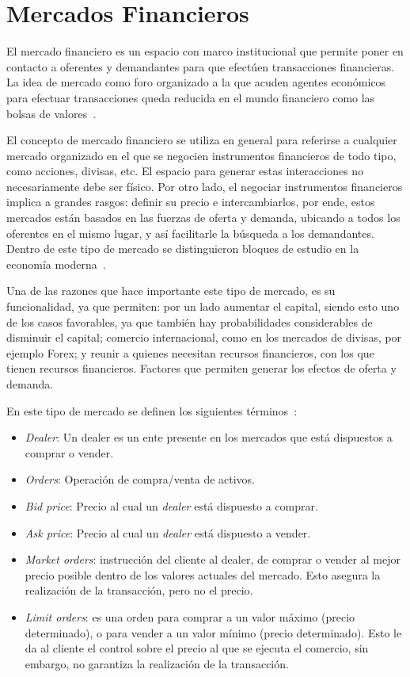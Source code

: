 \section{Mercados Financieros}

El mercado financiero es un espacio con marco institucional que permite poner
en contacto a oferentes y demandantes para que efectúen transacciones
financieras. La idea de mercado como foro organizado a la que acuden agentes
económicos para efectuar transacciones queda reducida en el mundo financiero
como las bolsas de valores~\cite{mishkin2006financial}.

El concepto de mercado financiero se utiliza en general para referirse a
cualquier mercado organizado en el que se negocien instrumentos financieros de
todo tipo, como acciones, divisas, etc. El espacio para generar estas
interacciones no necesariamente debe ser físico. Por otro lado, el negociar
instrumentos financieros implica a grandes rasgos: definir su precio e
intercambiarlos, por ende, estos mercados están basados en las fuerzas de
oferta y demanda, ubicando a todos los oferentes en el mismo lugar, y así
facilitarle la búsqueda a los demandantes. Dentro de este tipo de mercado se
distinguieron bloques de estudio en la economía moderna~\cite{jensen1984theory}.

Una de las razones que hace importante este tipo de mercado, es su
funcionalidad, ya que permiten: por un lado aumentar el capital, siendo esto
uno de los casos favorables, ya que también hay probabilidades considerables de
disminuir el capital; comercio internacional, como en los mercados de divisas,
por ejemplo Forex; y reunir a quienes necesitan recursos financieros, con los
que tienen recursos financieros. Factores que permiten generar los efectos de
oferta y demanda.

En este tipo de mercado se definen los siguientes términos~\cite{nevmyvaka2003electronic}:
\begin{itemize}
    \item \emph{Dealer}: Un dealer es un ente presente en los mercados que está
    dispuestos a comprar o vender.
    \item \emph{Orders}: Operación de compra/venta de activos.
    \item \emph{Bid price}: Precio al cual un \emph{dealer} está dispuesto a
    comprar.
    \item \emph{Ask price}: Precio al cual un \emph{dealer} está dispuesto a
    vender.
    \item \emph{Market orders}: instrucción del cliente al dealer, de comprar o
    vender al mejor precio posible dentro de los valores actuales del mercado.
    Esto asegura la realización de la transacción, pero no el precio.
    \item \emph{Limit orders}: es una orden para comprar a un valor máximo
    (precio determinado), o para vender a un valor mínimo (precio determinado).
    Esto le da al cliente el control sobre el precio al que se ejecuta el
    comercio, sin embargo, no garantiza la realización de la transacción.
\end{itemize}

